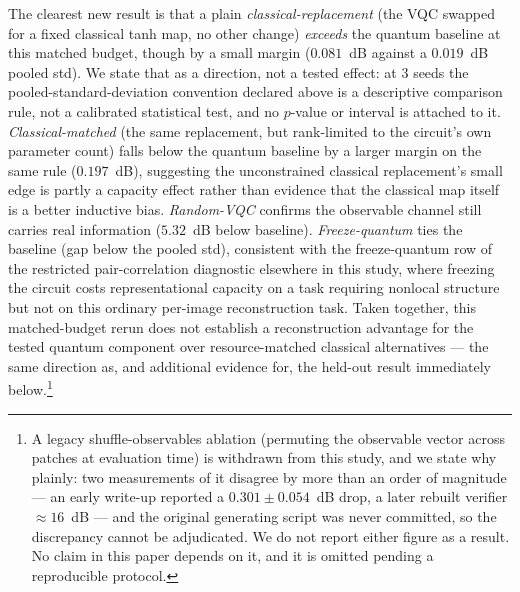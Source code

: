 \documentclass[11pt]{article}
\begin{document}
The clearest new result is that a plain \emph{classical-replacement} (the VQC swapped for a fixed classical tanh map, no other change) \emph{exceeds} the quantum baseline at this matched budget, though by a small margin ($0.081$~dB against a $0.019$~dB pooled std). We state that as a direction, not a tested effect: at 3 seeds the pooled-standard-deviation convention declared above is a descriptive comparison rule, not a calibrated statistical test, and no $p$-value or interval is attached to it. \emph{Classical-matched} (the same replacement, but rank-limited to the circuit's own parameter count) falls below the quantum baseline by a larger margin on the same rule ($0.197$~dB), suggesting the unconstrained classical replacement's small edge is partly a capacity effect rather than evidence that the classical map itself is a better inductive bias. \emph{Random-VQC} confirms the observable channel still carries real information ($5.32$~dB below baseline). \emph{Freeze-quantum} ties the baseline (gap below the pooled std), consistent with the freeze-quantum row of the restricted pair-correlation diagnostic elsewhere in this study, where freezing the circuit costs representational capacity on a task requiring nonlocal structure but not on this ordinary per-image reconstruction task. Taken together, this matched-budget rerun does not establish a reconstruction advantage for the tested quantum component over resource-matched classical alternatives --- the same direction as, and additional evidence for, the held-out result immediately below.\footnote{A legacy shuffle-observables ablation (permuting the observable vector across patches at evaluation time) is withdrawn from this study, and we state why plainly: two measurements of it disagree by more than an order of magnitude --- an early write-up reported a $0.301\pm0.054$~dB drop, a later rebuilt verifier $\approx16$~dB --- and the original generating script was never committed, so the discrepancy cannot be adjudicated. We do not report either figure as a result. No claim in this paper depends on it, and it is omitted pending a reproducible protocol.}
\end{document}
